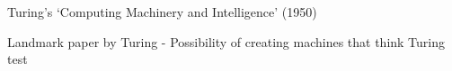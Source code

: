 %
%
%

\begin{frame}[t]{Turing's `Computing Machinery and Intelligence' (1950)} 

    Landmark paper by \gls{Turing}\cite{Turing:1950tt} - Possibility of creating machines that think
    Turing test

\end{frame}